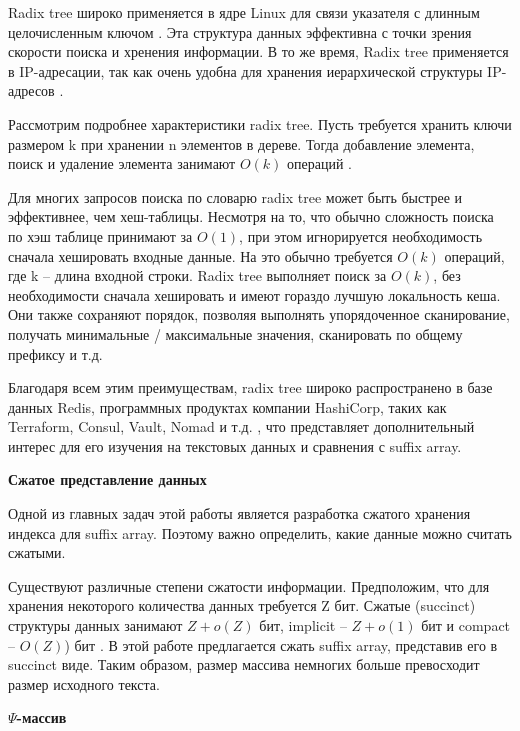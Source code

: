 Radix tree широко применяется в ядре Linux для связи указателя с длинным целочисленным ключом \cite{Linux2018}.
Эта структура данных эффективна с точки зрения скорости поиска и хренения информации.
В то же время, Radix tree применяется в IP-адресации, так как очень удобна для хранения
иерархической структуры IP-адресов \cite{Radix2019}.

Рассмотрим подробнее характеристики radix tree. Пусть требуется хранить ключи размером k
при хранении n элементов в дереве. Тогда добавление элемента, поиск и удаление элемента
занимают $O(k)$ операций \cite{leis2013adaptive}.

Для многих запросов поиска по словарю radix tree может быть быстрее и эффективнее, чем хеш-таблицы.
Несмотря на то, что обычно сложность поиска по хэш таблице принимают за $O(1)$,
при этом игнорируется необходимость сначала хешировать входные данные.
На это обычно требуется $O(k)$ операций, где k -- длина входной строки.
Radix tree выполняет поиск за $O(k)$, без необходимости сначала хешировать и имеют гораздо лучшую локальность кеша.
Они также сохраняют порядок, позволяя выполнять упорядоченное сканирование,
получать минимальные / максимальные значения, сканировать по общему префиксу и т.д.

Благодаря всем этим преимуществам, radix tree широко распространено в базе данных Redis, программных продуктах
компании HashiCorp, таких как Terraform, Consul, Vault, Nomad и т.д. \cite{Redis2018},
что представляет дополнительный интерес для его изучения на текстовых данных и сравнения с suffix array.

\textbf{Сжатое представление данных}

Одной из главных задач этой работы является разработка сжатого хранения индекса для suffix array.
Поэтому важно определить, какие данные можно считать сжатыми.

Существуют различные степени сжатости информации.
Предположим, что для хранения некоторого количества данных требуется Z бит.
Сжатые (succinct) структуры данных занимают \(Z + o(Z)\) бит, implicit -- \(Z + o(1)\) бит и
compact -- \(O(Z)\)) бит \cite{huo2014practical}. В этой работе предлагается сжать suffix array, представив его в succinct виде.
Таким образом, размер массива немногих больше превосходит размер исходного текста.

\textbf{$\Psi$-массив}

